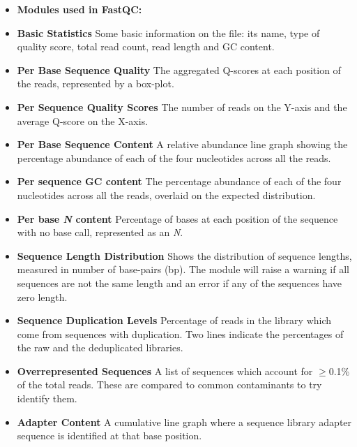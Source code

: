 \begin{itemize} \itemsep0em
\item[] \textbf{Modules used in FastQC:}
\item \textbf{Basic Statistics} \hspace{0.2cm} Some basic information on the file: its name, type of quality score, total read count, read length and GC content.
\item \textbf{Per Base Sequence Quality} \hspace{0.2cm} The aggregated Q-scores at each position of the reads, represented by a box-plot.
\item \textbf{Per Sequence Quality Scores} \hspace{0.2cm} The number of reads on the Y-axis and the average Q-score on the X-axis.
\item \textbf{Per Base Sequence Content} \hspace{0.2cm} A relative abundance line graph showing the percentage abundance of each of the four nucleotides across all the reads. 
\item \textbf{Per sequence GC content} \hspace{0.2cm} The percentage abundance of each of the four nucleotides across all the reads, overlaid on the expected distribution. 
\item \textbf{Per base \textit{N} content} \hspace{0.2cm} Percentage of bases at each position of the sequence with no base call, represented as an \textit{N}.
\item \textbf{Sequence Length Distribution}\hspace{0.2cm} Shows the distribution of sequence lengths, measured in number of base-pairs (bp). The module will raise a warning if all sequences are not the same length and an error if any of the sequences have zero length.
\item \textbf{Sequence Duplication Levels} \hspace{0.2cm} Percentage of reads in the library which come from sequences with duplication. Two lines indicate the percentages of the raw and the deduplicated libraries.
\item \textbf{Overrepresented Sequences} \hspace{0.2cm} A list of sequences which account for $\geq$0.1\% of the total reads. These are compared to common contaminants to try identify them.
\item \textbf{Adapter Content} \hspace{0.2cm} A cumulative line graph where a sequence library adapter sequence is identified at that base position.
\end{itemize}


